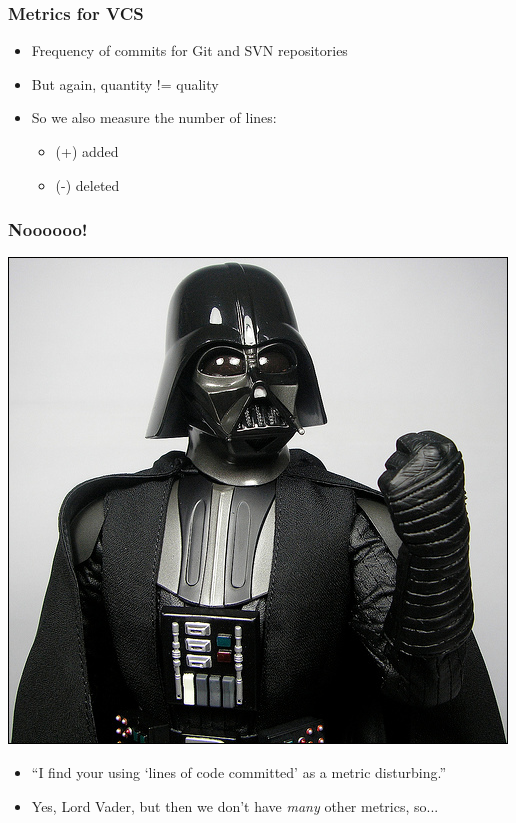 \documentclass[compress]{beamer}
\begin{document}
\begin{frame}
    \frametitle{Metrics for VCS}
    \begin{itemize}
        \item Frequency of commits for Git and SVN repositories
        \pause
        \item But again, quantity != quality
        \pause
        \item So we also measure the number of lines:
        \begin{itemize}
            \item (+) added
            \item (-) deleted
        \end{itemize}
    \end{itemize}
\end{frame}

\begin{frame}
    \frametitle{Noooooo!}
        \begin{center}
            \includegraphics[scale=.25]{vaderno.jpg}
        \end{center}
        \begin{itemize}
            \item ``I find your using `lines of code committed' as a metric disturbing.''
            \pause
            \item Yes, Lord Vader, but then we don't have \textit{many} other metrics, so...
        \end{itemize}
\end{frame}
\end{document}
